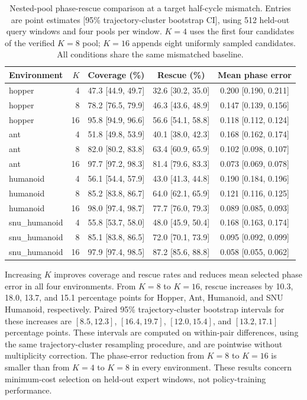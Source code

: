 \begin{table}[H]
\centering\small
\begin{tabular}{lrccc}
\toprule
Environment & $K$ & Coverage (\%) & Rescue (\%) & Mean phase error \\
\midrule
hopper & 4 & 47.3 [44.9, 49.7] & 32.6 [30.2, 35.0] & 0.200 [0.190, 0.211] \\
hopper & 8 & 78.2 [76.5, 79.9] & 46.3 [43.6, 48.9] & 0.147 [0.139, 0.156] \\
hopper & 16 & 95.8 [94.9, 96.6] & 56.6 [54.1, 58.8] & 0.118 [0.112, 0.124] \\
ant & 4 & 51.8 [49.8, 53.9] & 40.1 [38.0, 42.3] & 0.168 [0.162, 0.174] \\
ant & 8 & 82.0 [80.2, 83.8] & 63.4 [60.9, 65.9] & 0.102 [0.098, 0.107] \\
ant & 16 & 97.7 [97.2, 98.3] & 81.4 [79.6, 83.3] & 0.073 [0.069, 0.078] \\
humanoid & 4 & 56.1 [54.4, 57.9] & 43.0 [41.3, 44.8] & 0.190 [0.184, 0.196] \\
humanoid & 8 & 85.2 [83.8, 86.7] & 64.0 [62.1, 65.9] & 0.121 [0.116, 0.125] \\
humanoid & 16 & 98.0 [97.4, 98.7] & 77.7 [76.0, 79.3] & 0.089 [0.085, 0.093] \\
snu\_humanoid & 4 & 55.8 [53.7, 58.0] & 48.0 [45.9, 50.4] & 0.168 [0.163, 0.174] \\
snu\_humanoid & 8 & 85.1 [83.8, 86.5] & 72.0 [70.1, 73.9] & 0.095 [0.092, 0.099] \\
snu\_humanoid & 16 & 97.9 [97.4, 98.5] & 87.2 [85.6, 88.8] & 0.058 [0.055, 0.062] \\
\bottomrule
\end{tabular}
\caption{Nested-pool phase-rescue comparison at a target half-cycle mismatch. Entries are point estimates [95\% trajectory-cluster bootstrap CI], using 512 held-out query windows and four pools per window. $K=4$ uses the first four candidates of the verified $K=8$ pool; $K=16$ appends eight uniformly sampled candidates. All conditions share the same mismatched baseline.}
\label{tab:phase_rescue_k_sweep}
\end{table}


Increasing $K$ improves coverage and rescue rates and reduces mean
selected phase error in all four environments. From $K=8$ to $K=16$,
rescue increases by 10.3, 18.0, 13.7, and 15.1 percentage points for
Hopper, Ant, Humanoid, and SNU Humanoid, respectively. Paired 95\%
trajectory-cluster bootstrap intervals for these increases are
$[8.5,12.3]$, $[16.4,19.7]$, $[12.0,15.4]$, and $[13.2,17.1]$ percentage
points. These intervals are computed on within-pair differences,
using the same trajectory-cluster resampling procedure, and are
pointwise without multiplicity correction. The phase-error reduction
from $K=8$ to $K=16$ is smaller than from $K=4$ to $K=8$ in every
environment. These results concern minimum-cost selection on held-out
expert windows, not policy-training performance.


